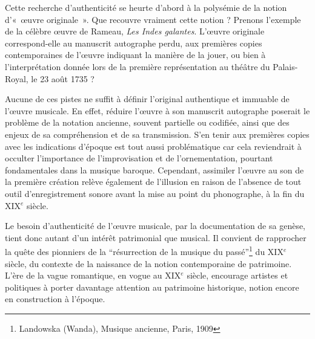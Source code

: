 \smallskip\indent Cette recherche d'authenticité se heurte d'abord à la polysémie de la notion d'«~œuvre originale~». Que recouvre vraiment cette notion ? Prenons l'exemple de la célèbre œuvre de Rameau, \textit{Les Indes galantes}. L'œuvre originale correspond-elle au manuscrit autographe perdu, aux premières copies contemporaines de l'œuvre indiquant la manière de la jouer, ou bien à l’interprétation donnée lors de la première représentation au théâtre du Palais-Royal, le 23 août 1735 ?

\smallskip\indent Aucune de ces pistes ne suffit à définir l'original authentique et immuable de l'œuvre musicale. En effet, réduire l'œuvre à son manuscrit autographe poserait le problème de la notation ancienne, souvent partielle ou codifiée, ainsi que des enjeux de sa compréhension et de sa transmission. S'en tenir aux premières copies avec les indications d'époque est tout aussi problématique car cela reviendrait à occulter l'importance de l'improvisation et de l'ornementation, pourtant fondamentales dans la musique baroque. Cependant, assimiler l'œuvre au son de la première création relève également de l'illusion en raison de l'absence de tout outil d'enregistrement sonore avant la mise au point du phonographe, à la fin du XIX$^{e}$ siècle.

\bigskip Le besoin d’authenticité de l'œuvre musicale, par la documentation de sa genèse, tient donc autant d’un intérêt patrimonial que musical. Il convient de rapprocher la quête des pionniers de la \enquote{résurrection de la musique du passé}\footnote{Landowska (Wanda), Musique ancienne, Paris, 1909} du XIX$^{e}$ siècle, du contexte de la naissance de la notion contemporaine de patrimoine. L’ère de la vague romantique, en vogue au XIX$^{e}$ siècle, encourage artistes et politiques à porter davantage attention au patrimoine historique, notion encore en construction à l’époque.

